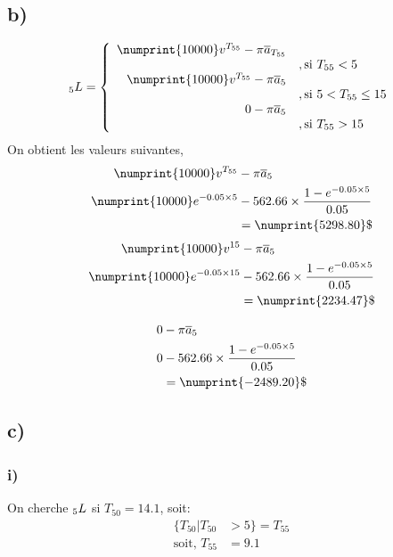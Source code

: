 \documentclass[11pt,french]{report}
\newcommand{\indiceGauche}[2]{{\vphantom{#2}}_{#1}#2}
\begin{document}
\subsection*{b)}
\begin{align*}
\indiceGauche{5}{L} =
     	\left\{
     	\begin{array}{rl}
     	\numprint{10000}v^{T_{55}} - \pi \overline{a}_{T_{55}}\\ &, \text{si } T_{55} < 5 \\
		 \numprint{10000}v^{T_{55}} - \pi \overline{a}_{5}\\ &, \text{si } 5<T_{55} \leq 15 \\
		 0 - \pi \overline{a}_{5}\\ &, \text{si } T_{55} > 15 \\
     	\end{array}
     	\right.	
\end{align*}
On obtient les valeurs suivantes,
\begin{align*}
\numprint{10000}v^{T_{55}} &- \pi \overline{a}_{5}\\
\numprint{10000}e^{-0.05 \times  5} &- 562.66 \times  \frac{1 - e^{-0.05 \times  5}}{0.05}\\
&= \numprint{5298.80}\$
\end{align*}
\begin{align*}
\numprint{10000}v^{15} &- \pi \overline{a}_{5}\\
\numprint{10000}e^{-0.05 \times  15} &- 562.66 \times  \frac{1 - e^{-0.05 \times  5}}{0.05}\\
&= \numprint{2234.47}\$
\end{align*}

\begin{align*}
0 &- \pi \overline{a}_{5}\\
0 &- 562.66 \times  \frac{1 - e^{-0.05 \times  5}}{0.05}\\
&= \numprint{-2489.20}\$
\end{align*}

\subsection*{c)}
\subsubsection*{i)}
On cherche $\indiceGauche{5}{L}$ si $T_{50} = 14.1$, soit:
\begin{align*}
\lbrace T_{50} | T_{50} &> 5\rbrace = T_{55}\\
\text{soit, } T_{55} &= 9.1 \\
\end{align*}
\end{document}
